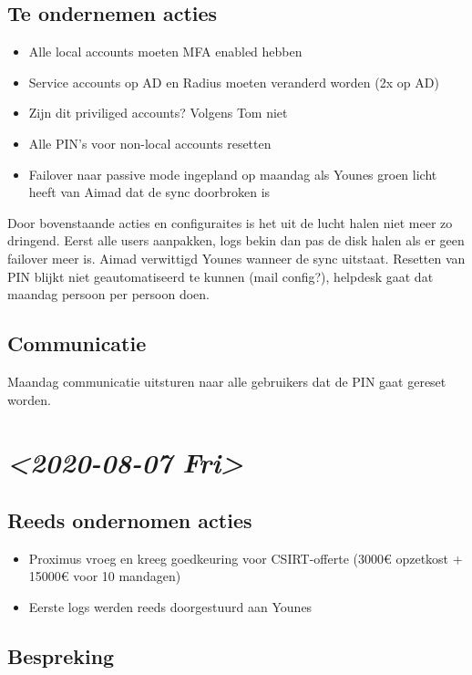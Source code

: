 \documentclass[11pt]{article}
\begin{document}
\subsection{Te ondernemen acties}
\label{sec:org8f9dcaa}
\begin{itemize}
\item Alle local accounts moeten MFA enabled hebben
\item Service accounts op AD en Radius moeten veranderd worden (2x op AD)
\item Zijn dit priviliged accounts? Volgens Tom niet
\item Alle PIN's voor non-local accounts resetten
\item Failover naar passive mode ingepland op maandag als Younes groen licht heeft van Aimad dat de sync doorbroken is
\end{itemize}

Door bovenstaande acties en configuraites is het uit de lucht halen niet meer zo dringend. Eerst alle users aanpakken, logs bekin dan pas de disk halen als er geen failover meer is. Aimad verwittigd Younes wanneer de sync uitstaat. Resetten van PIN blijkt niet geautomatiseerd te kunnen (mail config?), helpdesk gaat dat maandag persoon per persoon doen.

\subsection{Communicatie}
\label{sec:org4fa95ef}

Maandag communicatie uitsturen naar alle gebruikers dat de PIN gaat gereset worden.

\section{\textit{<2020-08-07 Fri>}}
\label{sec:orgd15c90e}

\subsection{Reeds ondernomen acties}
\label{sec:orgfd654da}
\begin{itemize}
\item Proximus vroeg en kreeg goedkeuring voor CSIRT-offerte (3000€ opzetkost + 15000€ voor 10 mandagen)
\item Eerste logs werden reeds doorgestuurd aan Younes
\end{itemize}

\subsection{Bespreking}
\label{sec:orgbd40c49}
\end{document}
